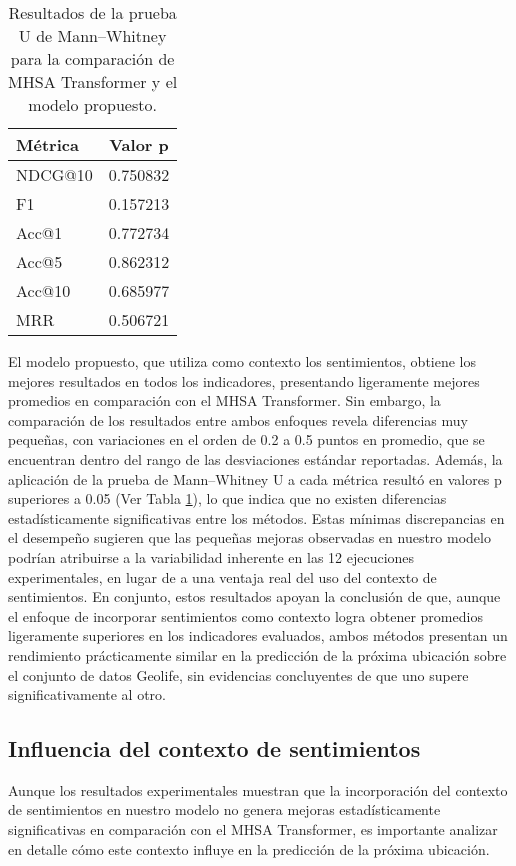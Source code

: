 \begin{table}[h]
    \centering
    \caption{Resultados de la prueba U de Mann–Whitney para la comparación de MHSA Transformer y el modelo propuesto.}
    \label{tab:3}
    \begin{tabular}{lc}
        \toprule
        Métrica & Valor p \\
        \midrule
        NDCG@10 & 0.750832 \\
        F1      & 0.157213 \\
        Acc@1   & 0.772734 \\
        Acc@5   & 0.862312 \\
        Acc@10  & 0.685977 \\
        MRR     & 0.506721 \\
        \bottomrule
    \end{tabular}
\end{table}
\newpage
El modelo propuesto, que utiliza como contexto los 
sentimientos, obtiene los mejores resultados en todos los 
indicadores, presentando ligeramente mejores promedios en 
comparación con el MHSA Transformer. Sin embargo, 
la comparación de los resultados entre ambos enfoques 
revela diferencias muy pequeñas, con variaciones en el 
orden de 0.2 a 0.5 puntos en promedio, que se encuentran 
dentro del rango de las desviaciones estándar reportadas. 
Además, la aplicación de la prueba de Mann–Whitney U a 
cada métrica resultó en valores p superiores a 0.05 (Ver Tabla \ref{tab:3}), lo que indica que no 
existen diferencias estadísticamente significativas entre 
los métodos. Estas mínimas discrepancias en el desempeño 
sugieren que las pequeñas mejoras observadas en nuestro 
modelo podrían atribuirse a la variabilidad inherente en 
las 12 ejecuciones experimentales, en lugar de a una 
ventaja real del uso del contexto de sentimientos. 
En conjunto, estos resultados apoyan la conclusión de que, 
aunque el enfoque de incorporar sentimientos como contexto 
logra obtener promedios ligeramente superiores en los 
indicadores evaluados, ambos métodos presentan un 
rendimiento prácticamente similar en la predicción de 
la próxima ubicación sobre el conjunto de datos Geolife, 
sin evidencias concluyentes de que uno supere 
significativamente al otro.

\subsection{Influencia del contexto de sentimientos}
Aunque los resultados experimentales muestran que la 
incorporación del contexto de sentimientos en nuestro modelo 
no genera mejoras estadísticamente significativas en comparación 
con el MHSA Transformer, es importante analizar en detalle cómo 
este contexto influye en la predicción de la próxima ubicación. 

